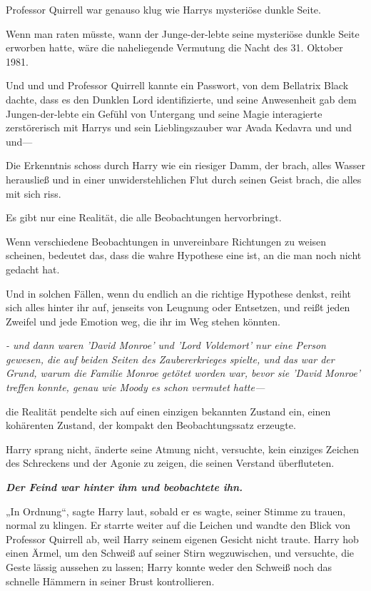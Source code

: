 {{Professor Quirrell war genauso klug wie Harrys mysteriöse dunkle Seite.

Wenn man raten müsste, wann der Junge-der-lebte seine mysteriöse dunkle Seite erworben hatte, wäre die naheliegende Vermutung die Nacht des 31. Oktober 1981.}

Und und und Professor Quirrell kannte ein Passwort, von dem Bellatrix Black dachte, dass es den Dunklen Lord identifizierte, und seine Anwesenheit gab dem Jungen-der-lebte ein Gefühl von Untergang und seine Magie interagierte zerstörerisch mit Harrys und sein Lieblingszauber war Avada Kedavra und und und—

Die Erkenntnis schoss durch Harry wie ein riesiger Damm, der brach, alles Wasser herausließ und in einer unwiderstehlichen Flut durch seinen Geist brach, die alles mit sich riss.

Es gibt nur eine Realität, die alle Beobachtungen hervorbringt.

Wenn verschiedene Beobachtungen in unvereinbare Richtungen zu weisen scheinen, bedeutet das, dass die wahre Hypothese eine ist, an die man noch nicht gedacht hat.

Und in solchen Fällen, wenn du endlich an die richtige Hypothese denkst, reiht sich alles hinter ihr auf, jenseits von Leugnung oder Entsetzen, und reißt jeden Zweifel und jede Emotion weg, die ihr im Weg stehen könnten.

\emph{- und dann waren 'David Monroe' und 'Lord Voldemort' nur eine Person gewesen, die auf beiden Seiten des Zaubererkrieges spielte, und das war der Grund, warum die Familie Monroe getötet worden war, bevor sie 'David Monroe' treffen konnte, genau wie Moody es schon vermutet hatte—}

die Realität pendelte sich auf einen einzigen bekannten Zustand ein, einen kohärenten Zustand, der kompakt den Beobachtungssatz erzeugte.

Harry sprang nicht, änderte seine Atmung nicht, versuchte, kein einziges Zeichen des Schreckens und der Agonie zu zeigen, die seinen Verstand überfluteten.

\textbf{\emph{Der Feind war hinter ihm und beobachtete ihn.}}

„In Ordnung“, sagte Harry laut, sobald er es wagte, seiner Stimme zu trauen, normal zu klingen. Er starrte weiter auf die Leichen und wandte den Blick von Professor Quirrell ab, weil Harry seinem eigenen Gesicht nicht traute. Harry hob einen Ärmel, um den Schweiß auf seiner Stirn wegzuwischen, und versuchte, die Geste lässig aussehen zu lassen; Harry konnte weder den Schweiß noch das schnelle Hämmern in seiner Brust kontrollieren.

}
